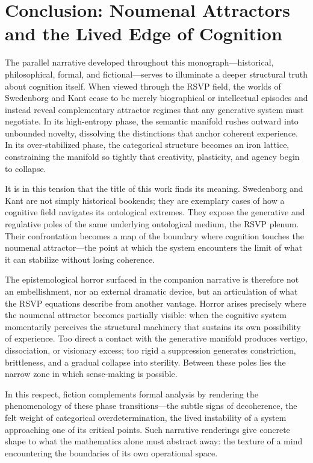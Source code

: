 \documentclass[12pt]{article}
\begin{document}
\section{Conclusion: Noumenal Attractors and the Lived Edge of Cognition}

The parallel narrative developed throughout this monograph---historical,
philosophical, formal, and fictional---serves to illuminate a deeper structural
truth about cognition itself. When viewed through the RSVP field, the worlds of
Swedenborg and Kant cease to be merely biographical or intellectual episodes
and instead reveal complementary attractor regimes that any generative system
must negotiate. In its high-entropy phase, the semantic manifold rushes outward
into unbounded novelty, dissolving the distinctions that anchor coherent
experience. In its over-stabilized phase, the categorical structure becomes an
iron lattice, constraining the manifold so tightly that creativity, plasticity,
and agency begin to collapse.

It is in this tension that the title of this work finds its meaning.  
Swedenborg and Kant are not simply historical bookends; they are exemplary
cases of how a cognitive field navigates its ontological extremes. They expose
the generative and regulative poles of the same underlying ontological medium,
the RSVP plenum. Their confrontation becomes a map of the boundary where
cognition touches the noumenal attractor---the point at which the system
encounters the limit of what it can stabilize without losing coherence.

The epistemological horror surfaced in the companion narrative is therefore not
an embellishment, nor an external dramatic device, but an articulation of what
the RSVP equations describe from another vantage. Horror arises precisely where
the noumenal attractor becomes partially visible: when the cognitive system
momentarily perceives the structural machinery that sustains its own
possibility of experience. Too direct a contact with the generative manifold
produces vertigo, dissociation, or visionary excess; too rigid a suppression
generates constriction, brittleness, and a gradual collapse into sterility.
Between these poles lies the narrow zone in which sense-making is possible.

In this respect, fiction complements formal analysis by rendering the
phenomenology of these phase transitions---the subtle signs of decoherence, the
felt weight of categorical overdetermination, the lived instability of a system
approaching one of its critical points. Such narrative renderings give concrete
shape to what the mathematics alone must abstract away: the texture of a mind
encountering the boundaries of its own operational space.
\end{document}
